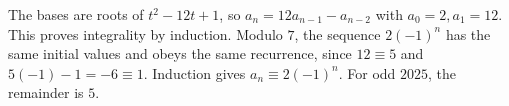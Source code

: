 The bases are roots of $t^2-12t+1$, so $a_n=12a_{n-1}-a_{n-2}$ with $a_0=2,a_1=12$. This proves integrality by induction. Modulo $7$, the sequence $2(-1)^n$ has the same initial values and obeys the same recurrence, since $12\equiv5$ and $5(-1)-1=-6\equiv1$. Induction gives $a_n\equiv2(-1)^n$. For odd $2025$, the remainder is $\boxed5$.
